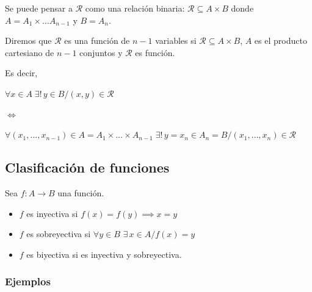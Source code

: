 Se puede pensar a $\mathcal{R}$ como una relación binaria: 
$\mathcal{R} \subseteq A \times B$ donde $A = A_1 \times \dots A_{n-1}$ y 
$B = A_n$.

Diremos que $\mathcal{R}$ es una función de $n-1$ variables si 
$\mathcal{R} \subseteq A \times B$, $A$ es el producto cartesiano de $n-1$ 
conjuntos y $\mathcal{R}$ es función.

Es decir, 
    \begin{center}
        $\forall x \in A \; \exists ! \, y \in B / (x,y) \in \mathcal{R}$

        $\iff$

        $\forall (x_1, \dotsc, x_{n-1}) \in A = A_1 \times \dots \times A_{n-1}
        \; \exists ! \, y=x_n \in A_n = B / (x_1, \dotsc, x_n) \in \mathcal{R}$
    \end{center}


\subsection{Clasificación de funciones}

Sea $f: A \to B$ una función.

\begin{itemize}
    \item $f$ es inyectiva si $f(x) = f(y) \implies x = y$
    \item $f$ es sobreyectiva si $\forall y \in B$  $\exists \, x \in A / f(x)=y$
    \item $f$ es biyectiva si es inyectiva y sobreyectiva.
\end{itemize}

\subsubsection{Ejemplos}

